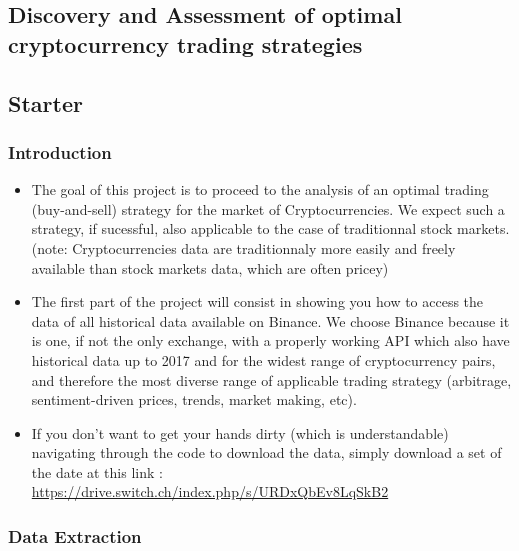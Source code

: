 \documentclass[twoside]{report}
\date{June 2021}
\begin{document}
\begin{spacing}{1}

\selectfont
\tableofcontents



\begin{abstract}

\end{abstract}


\chapter{Discovery and Assessment of optimal cryptocurrency trading strategies} 
\section{Starter}
\subsection{Introduction}
\begin{itemize}
    \item 
The goal of this project is to proceed to the analysis of an optimal trading (buy-and-sell) strategy for the market of Cryptocurrencies. We expect such a strategy, if sucessful, also applicable to the case of traditionnal stock markets. (note: Cryptocurrencies data are traditionnaly more easily and freely available than stock markets data, which are often pricey)
    \item
The first part of the project will consist in showing you how to access the data of all historical data available on Binance. We choose Binance because it is one, if not the only exchange, with a properly working API which also have historical data up to 2017 and for the widest range of cryptocurrency pairs, and therefore the most diverse range of applicable trading strategy (arbitrage, sentiment-driven prices, trends, market making, etc).
    \item{
If you don't want to get your hands dirty (which is understandable) navigating through the code to download the data, simply download a set of the date at this link : \url{https://drive.switch.ch/index.php/s/URDxQbEv8LqSkB2}}

\end{itemize}



\subsection{Data Extraction}


\end{spacing}
\end{document}
